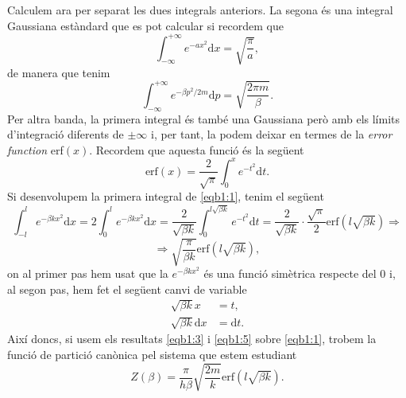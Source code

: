 \documentclass[a4paper, 10pt]{article}
\begin{document}
\begin{enumerate}
Calculem ara per separat les dues integrals anteriors. La segona és una integral Gaussiana estàndard que es pot calcular si recordem que
\begin{equation}
	\int_{-\infty}^{+\infty} e^{-ax^2}\mathrm{d}x = \sqrt{\frac{\pi}{a}}, \label{eqb1:2}
\end{equation}
de manera que tenim
\begin{equation}
	\int_{-\infty}^{+\infty} e^{-\beta p^2/2m} \mathrm{d}p = \sqrt{\frac{2\pi m}{\beta}}. \label{eqb1:3}
\end{equation}
Per altra banda, la primera integral és també una Gaussiana però amb els límits d'integració diferents de $\pm \infty$ i, per tant, la podem deixar en termes de la \textit{error function} erf$(x)$. Recordem que aquesta funció és la següent
\begin{equation}
	\mathrm{erf}(x) = \frac{2}{\sqrt{\pi}} \int_0^x e^{-t^2}\mathrm{d}t. \label{eqb1:4}
\end{equation}
Si desenvolupem la primera integral de \eqref{eqb1:1}, tenim el següent
\begin{equation*}
	\int_{-l}^{l} e^{-\beta kx^2}\mathrm{d}x = 2 \int_{0}^{l} e^{-\beta kx^2}\mathrm{d}x = \frac{2}{\sqrt{\beta k}}\int_0^{l\sqrt{\beta k}}e^{-t^2}\mathrm{d}t = \frac{2}{\sqrt{\beta k}} \cdot \frac{\sqrt{\pi}}{2}\mathrm{erf}(l\sqrt{\beta k}) \Rightarrow
\end{equation*}
\begin{equation}
	\Rightarrow \sqrt{\frac{\pi}{\beta k}} \mathrm{erf}(l\sqrt{\beta k}), \label{eqb1:5}
\end{equation}
on al primer pas hem usat que la $e^{-\beta k x^2}$ és una funció simètrica respecte del 0 i, al segon pas, hem fet el següent canvi de variable
\begin{align*}
	\sqrt{\beta k} x &= t, \\
	\sqrt{\beta k} \mathrm{d}x &= \mathrm{d}t.
\end{align*}
Així doncs, si usem els resultats \eqref{eqb1:3} i \eqref{eqb1:5} sobre \eqref{eqb1:1}, trobem la funció de partició canònica pel sistema que estem estudiant
\begin{equation}
	\boxed{Z(\beta) = \frac{\pi}{h\beta}\sqrt{\frac{2m}{k}}\mathrm{erf}(l\sqrt{\beta k})}. \label{eqb1:6}
\end{equation}


\end{enumerate}
\end{document}

